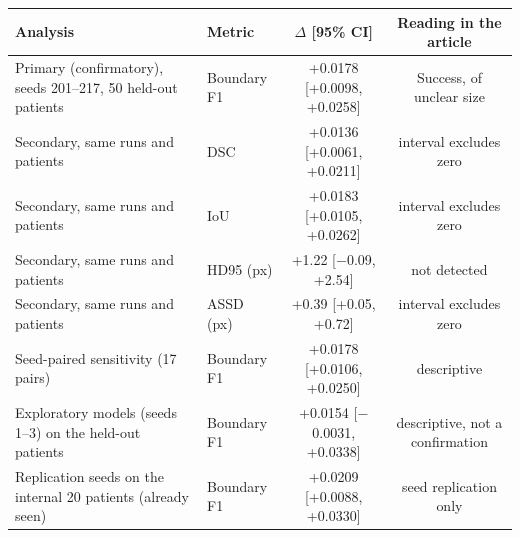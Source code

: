 \begin{tabular}{llcc}
\toprule
Analysis & Metric & $\Delta$ [95\% CI] & Reading in the article \\
\midrule
Primary (confirmatory), seeds 201--217, 50 held-out patients & Boundary F1 & +0.0178 [+0.0098, +0.0258] & Success, of unclear size \\
\addlinespace
Secondary, same runs and patients & DSC & +0.0136 [+0.0061, +0.0211] & interval excludes zero \\
Secondary, same runs and patients & IoU & +0.0183 [+0.0105, +0.0262] & interval excludes zero \\
Secondary, same runs and patients & HD95 (px) & +1.22 [$-$0.09, +2.54] & not detected \\
Secondary, same runs and patients & ASSD (px) & +0.39 [+0.05, +0.72] & interval excludes zero \\
\addlinespace
Seed-paired sensitivity (17 pairs) & Boundary F1 & +0.0178 [+0.0106, +0.0250] & descriptive \\
Exploratory models (seeds 1--3) on the held-out patients & Boundary F1 & +0.0154 [$-$0.0031, +0.0338] & descriptive, not a confirmation \\
Replication seeds on the internal 20 patients (already seen) & Boundary F1 & +0.0209 [+0.0088, +0.0330] & seed replication only \\
\bottomrule
\end{tabular}
